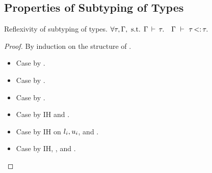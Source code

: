 \subsection{Properties of Subtyping of Types}%
\label{subsec:props-subty-proof}


\begin{theorem}{Reflexivity of subtyping of types.}\label{thm:sub-ty-refl}
    $
        \forall \tau, \Gamma, \text{ s.t. } \Gamma\,\vdash\,\tau.\quad
        \Gamma\ \vdash\ \tau \operatorname{<:} \tau.
    $
\end{theorem}
\begin{proof}
    By induction on the structure of \ty.
    \begin{itemize}
        \item Case \tyany by .
        \item Case \tybot by .
        \item Case \vany by .
        \item Case  by IH and .
        \item Case \tyinv{} by IH on
            $l_i, u_i$, and .
        \item Case  by IH, ,
            and .
    \end{itemize}
\end{proof}

